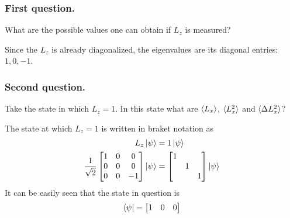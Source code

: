 \documentclass[../../../main.tex]{subfiles}
\begin{document}
\subsubsection{First question.}
What are the possible values one can obtain if $L_z$ is measured?

Since the $L_z$ is already diagonalized, the eigenvalues are its diagonal entries: $1,0,-1$.

\subsubsection{Second question.}
Take the state in which $L_z=1$. 
In this state what are $\braket{L_x}$, $\braket{L_x^2}$ and $\braket{\Delta L_x^2}$?

The state at which $L_z=1$ is written in braket notation as 
\begin{align*}
    L_z \ket{\psi}&=  1 \ket{\psi}\\
    \frac{1 }{\sqrt{2 }}\begin{bmatrix}
        1&0&0\\
        0&0&0\\
        0&0&-1\\
    \end{bmatrix}
    \ket{\psi} &= 
    \begin{bmatrix}
        1&&\\
        &1&\\
        &&1\\
    \end{bmatrix}
    \ket{\psi}
\end{align*}
It can be easily seen that the state in question is 
\begin{align*}
    \bra{\psi}=\begin{bmatrix}
        1&0&0
    \end{bmatrix}
\end{align*}
\end{document}
